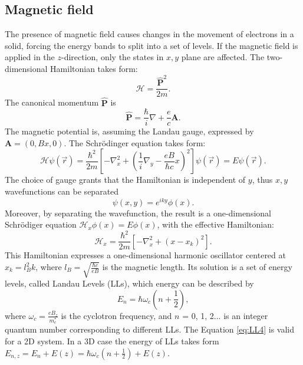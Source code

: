 \documentclass[titlepage,a4paper]{book}
\newcommand{\wciecie}{\quad\phantom{v}}
\begin{document}
\subsection{Magnetic field}
\label{section:DOS_at_magneticField}
\wciecie
The presence of magnetic field causes changes in the movement of electrons in a solid, forcing the energy bands to split into a set of levels. If the magnetic field is applied in the $z$-direction, only the states in $x,y$ plane are affected. The two-dimensional Hamiltonian takes form:
\begin{equation}
\label{eq:LL0}
\mathcal{H} = \frac{\hat{\mathbf{P}}^2}{2m}.  
\end{equation}
The canonical momentum $\mathbf{\hat{P}}$ is 
\begin{equation}
\label{eq:LL1}
\hat{\mathbf{P}} = \frac{\hbar}{i}\nabla + \frac{e}{c}\mathbf{A}.  
\end{equation}
The magnetic potential is, assuming the Landau gauge, expressed by $\mathbf{A} = (0, Bx, 0)$. The Schrödinger equation takes form:
\begin{equation}
\label{eq:LL2}
\mathcal{H}\psi(\vec{r}) = \frac{\hbar^2}{2m} \left[ -\nabla_x^2 + \left( \frac{1}{i}\nabla_y - \frac{eB}{\hbar c}x \right)^2 \right] \psi(\vec{r}) = E\psi(\vec{r}).
\end{equation}
The choice of gauge grants that the Hamiltonian is independent of $y$, thus $x, y$ wavefunctions can be separated
\begin{equation}
\label{eq:LL2.5}
\psi (x,y) = e^{iky}\phi (x). 
\end{equation}
Moreover, by separating the wavefunction, the result is a one-dimensional Schrödiger equation $\mathcal{H}_x \phi(x) = E \phi(x)$, with the effective Hamiltonian:
\begin{equation}
\label{eq:LL3}
\mathcal{H}_x = \frac{\hbar^2}{2m} \left[ -\nabla_x^2 +(x-x_k)^2 \right].
\end{equation}
This Hamiltonian expresses a one-dimensional harmonic oscillator centered at $x_k = l_B^2 k$, where $l_B = \sqrt{\frac{\hbar c}{eB}}$ is the magnetic length. Its solution is a set of energy levels, called Landau Levels (LLs), which energy can be described by
\begin{equation}
\label{eq:LL4}
E_n = \hbar\omega_c\left( n+\frac{1}{2} \right),
\end{equation}
where $\omega_c = \frac{eB_z}{m_c^*}$ is the cyclotron frequency, and $n$ = 0, 1, 2... is an integer quantum number corresponding to different LLs. The Equation \ref{eq:LL4} is valid for a 2D system. In a 3D case the energy of LLs takes form $E_{n,z} = E_n + E(z) = \hbar\omega_c\left( n+\frac{1}{2} \right)+ E(z)$.
\end{document}
